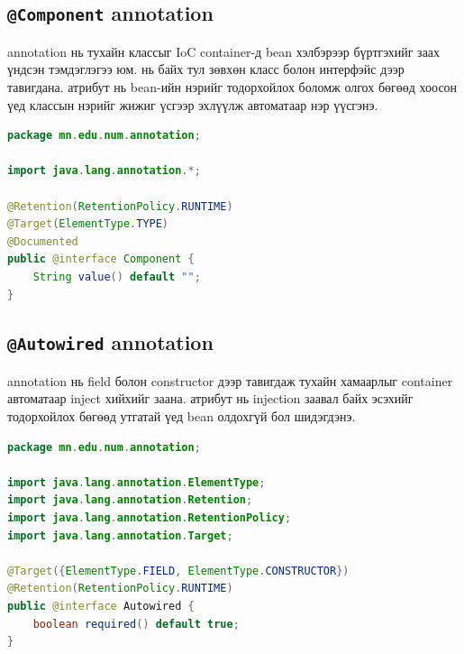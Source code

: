 \subsection{\texttt{@Component} annotation}

 annotation нь тухайн классыг IoC container-д bean
хэлбэрээр бүртгэхийг заах үндсэн тэмдэглэгээ юм. 
нь  байх тул зөвхөн класс болон интерфэйс
дээр тавигдана.  атрибут нь bean-ийн нэрийг тодорхойлох
боломж олгох бөгөөд хоосон үед  классын нэрийг
жижиг үсгээр эхлүүлж автоматаар нэр үүсгэнэ.

\begin{lstlisting}[language=Java,
    caption={Component annotation-ийн хэрэгжүүлэлт},
    label={lst:component-annotation}]
package mn.edu.num.annotation;

import java.lang.annotation.*;
    
@Retention(RetentionPolicy.RUNTIME)
@Target(ElementType.TYPE)
@Documented
public @interface Component {
    String value() default "";
}

\end{lstlisting}

\subsection{\texttt{@Autowired} annotation}

 annotation нь field болон constructor дээр тавигдаж
тухайн хамаарлыг container автоматаар inject хийхийг заана.
 атрибут нь injection заавал байх эсэхийг тодорхойлох
бөгөөд  утгатай үед bean олдохгүй бол
 шидэгдэнэ.

\begin{lstlisting}[language=Java,
    caption={\texttt{@Autowired} annotation-ийн хэрэгжүүлэлт},
    label={lst:autowired-annotation}]
package mn.edu.num.annotation;

import java.lang.annotation.ElementType;
import java.lang.annotation.Retention;
import java.lang.annotation.RetentionPolicy;
import java.lang.annotation.Target;

@Target({ElementType.FIELD, ElementType.CONSTRUCTOR})
@Retention(RetentionPolicy.RUNTIME)
public @interface Autowired {
    boolean required() default true;
}

\end{lstlisting}


